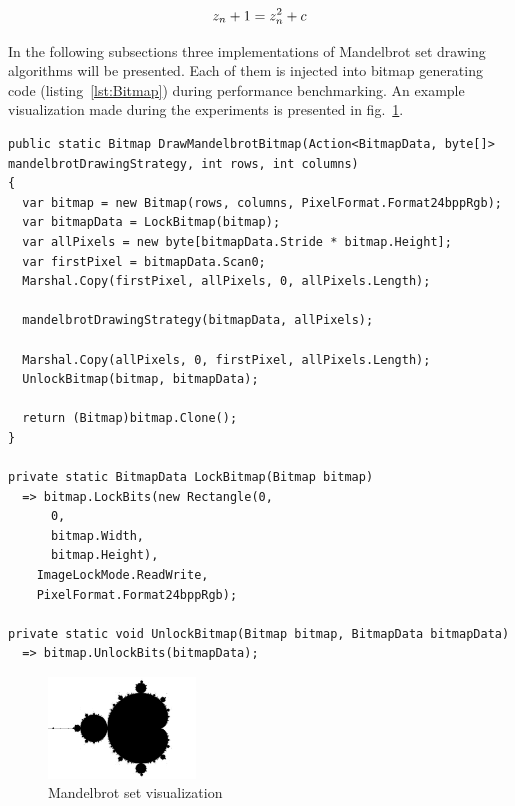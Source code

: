 \begin{equation}
\centering 
z_n + 1 = z_n^2 + c
\label{eq:Mandelbrot}
\end{equation}

In the following subsections three implementations of Mandelbrot set drawing algorithms will be presented. Each of them is injected into bitmap generating code (listing~\ref{lst:Bitmap}) during performance benchmarking. An example visualization made during the experiments is presented in fig.~\ref{fig:MandelbrotVis}.

\begin{lstlisting}[style=sharpcstyle, caption={Mandelbrot bitmap generation}, label={lst:Bitmap},
numbers=none, xleftmargin=0pt,framexleftmargin=0pt,framexrightmargin=0pt,framexbottommargin=0pt]
public static Bitmap DrawMandelbrotBitmap(Action<BitmapData, byte[]> mandelbrotDrawingStrategy, int rows, int columns)
{
  var bitmap = new Bitmap(rows, columns, PixelFormat.Format24bppRgb);
  var bitmapData = LockBitmap(bitmap);
  var allPixels = new byte[bitmapData.Stride * bitmap.Height];
  var firstPixel = bitmapData.Scan0;
  Marshal.Copy(firstPixel, allPixels, 0, allPixels.Length);

  mandelbrotDrawingStrategy(bitmapData, allPixels);

  Marshal.Copy(allPixels, 0, firstPixel, allPixels.Length);
  UnlockBitmap(bitmap, bitmapData);

  return (Bitmap)bitmap.Clone();
}

private static BitmapData LockBitmap(Bitmap bitmap) 
  => bitmap.LockBits(new Rectangle(0,
      0,
      bitmap.Width,
      bitmap.Height),
    ImageLockMode.ReadWrite,
    PixelFormat.Format24bppRgb);

private static void UnlockBitmap(Bitmap bitmap, BitmapData bitmapData) 
  => bitmap.UnlockBits(bitmapData);

\end{lstlisting}

\begin{figure}[!ht]
	\centering
		\includegraphics[width = 0.35\textwidth]{figures04/MandelbrotVis.png}
	\caption{Mandelbrot set visualization}
	\label{fig:MandelbrotVis}
\end{figure}

